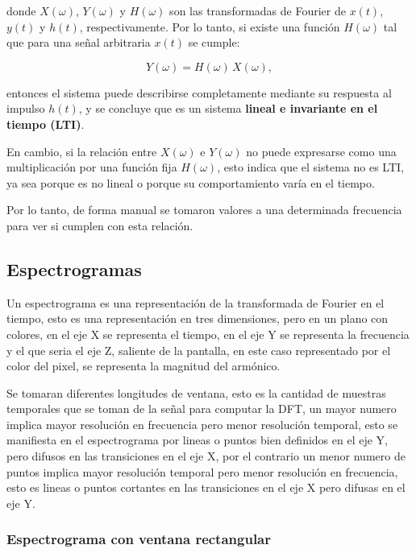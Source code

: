 \documentclass[12pt]{article}
\begin{document}
donde $X(\omega)$, $Y(\omega)$ y $H(\omega)$ son las transformadas de Fourier de $x(t)$, $y(t)$ y $h(t)$, respectivamente. Por lo tanto, si existe una función $H(\omega)$ tal que para una señal arbitraria $x(t)$ se cumple:

\[
Y(\omega) = H(\omega)\, X(\omega),
\]

entonces el sistema puede describirse completamente mediante su respuesta al impulso $h(t)$, y se concluye que es un sistema \textbf{lineal e invariante en el tiempo (LTI)}.

En cambio, si la relación entre $X(\omega)$ e $Y(\omega)$ no puede expresarse como una multiplicación por una función fija $H(\omega)$, esto indica que el sistema no es LTI, ya sea porque es no lineal o porque su comportamiento varía en el tiempo.

Por lo tanto, de forma manual se tomaron valores a una determinada frecuencia para ver si cumplen con esta relación. 


\hypertarget{espectogramas}{%
\subsection{Espectrogramas}\label{espectogramas}}

Un espectrograma es una representación de la transformada de Fourier en el tiempo, esto es una representación en tres dimensiones, pero en un plano con colores, en el eje X se representa el tiempo, en el eje Y se representa la frecuencia y el que seria el eje Z, saliente de la pantalla, en este caso representado por el color del pixel, se representa la magnitud del armónico.

Se tomaran diferentes longitudes de ventana, esto es la cantidad de muestras temporales que se toman de la señal para computar la DFT, un mayor numero implica mayor resolución en frecuencia pero menor resolución temporal, esto se manifiesta en el espectrograma por lineas o puntos bien definidos en el eje Y, pero difusos en las transiciones en el eje X, por el contrario un menor numero de puntos implica mayor resolución temporal pero menor resolución en frecuencia, esto es lineas o puntos cortantes en las transiciones en el eje X pero difusas en el eje Y.

\hypertarget{espectograma-ventana-rectangular}{%
\subsubsection{Espectrograma con ventana rectangular}\label{espectograma-ventana-rectangular}}
\end{document}
